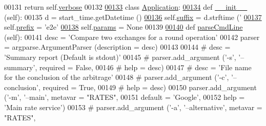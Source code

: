 \begin{DoxyCode}
00131         \textcolor{keywordflow}{return} self.\hyperlink{classe2e_1_1_parameters_a84d862bf507bb0325f5daf3b7e5d9ab3}{verbose}
00132         
\hyperlink{classe2e_1_1_application}{00133} \textcolor{keyword}{class }\hyperlink{classe2e_1_1_application}{Application}:
\hyperlink{classe2e_1_1_application_a2267bd2e8d3114095e6271aed7f8c8c9}{00134}     \textcolor{keyword}{def }\hyperlink{classe2e_1_1_application_a2267bd2e8d3114095e6271aed7f8c8c9}{\_\_init\_\_} (self):
00135         d = start\_time.getDatetime ()
\hyperlink{classe2e_1_1_application_a4d824ad36b051d2d629edb314385df0d}{00136}         self.\hyperlink{classe2e_1_1_application_a4d824ad36b051d2d629edb314385df0d}{suffix} = d.strftime (\textcolor{stringliteral}{'%
\hyperlink{classe2e_1_1_application_a027ff25e5409ae17584978a09fc2611a}{00137}         self.\hyperlink{classe2e_1_1_application_a027ff25e5409ae17584978a09fc2611a}{prefix} = \textcolor{stringliteral}{'e2e'}
\hyperlink{classe2e_1_1_application_a57206c6ccc86c2659edfd8d73d2029f3}{00138}         self.\hyperlink{classe2e_1_1_application_a57206c6ccc86c2659edfd8d73d2029f3}{params} = \textcolor{keywordtype}{None}
00139     
\hyperlink{classe2e_1_1_application_a91b8b6df6456d27bed503849ffcdcc77}{00140}     \textcolor{keyword}{def }\hyperlink{classe2e_1_1_application_a91b8b6df6456d27bed503849ffcdcc77}{parseCmdLine} (self):
00141         desc = \textcolor{stringliteral}{'Compare two exchanges for a round operation'}
00142         parser = argparse.ArgumentParser (description = desc)
00143         
00144 \textcolor{comment}{#        desc = 'Summary report (Default is stdout)' }
00145 \textcolor{comment}{#        parser.add\_argument ('-s', '--summary', required = False,}
00146 \textcolor{comment}{#                             help = desc)}
00147 \textcolor{comment}{#        desc = 'File name for the conclusion of the arbitrage'}
00148 \textcolor{comment}{#        parser.add\_argument ('-c', '--conclusion', required = True,}
00149 \textcolor{comment}{#                             help = desc)}
00150         parser.add\_argument (\textcolor{stringliteral}{'-m'}, \textcolor{stringliteral}{'--main'}, metavar = \textcolor{stringliteral}{"RATES"}, 
00151                              default = \textcolor{stringliteral}{'Google'},
00152                              help = \textcolor{stringliteral}{'Main rate service'})
00153 \textcolor{comment}{#        parser.add\_argument ('-a', '--alternative', metavar = "RATES",}
}
\end{DoxyCode}

